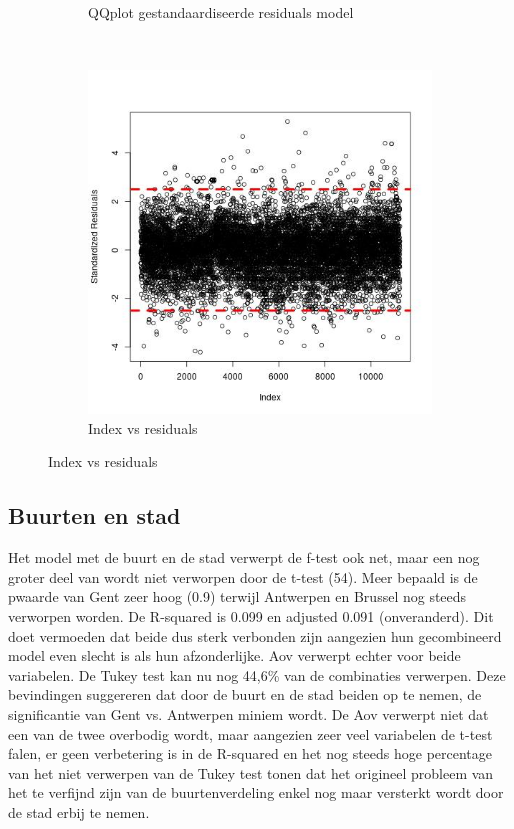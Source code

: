 \documentclass[a4paper,kulak]{kulakarticle} %
\begin{document}
\begin{figure}[H]
\begin{subfigure}[b]{0.3\textwidth}
		\caption{QQplot gestandaardiseerde residuals model}
		\label{fig:qqne}
	\end{subfigure}
	~
	\begin{subfigure}[b]{0.3\textwidth}
		\includegraphics[width=\textwidth]{stdne.jpg}
		\caption{Index vs residuals}
		\label{fig:stdne}
	\end{subfigure}
\end{figure}

\subsection{Buurten en stad}
Het model met de buurt en de stad verwerpt de f-test ook net, maar een nog groter deel van  wordt niet verworpen door de t-test (54). Meer bepaald is de pwaarde van Gent zeer hoog (0.9) terwijl Antwerpen en Brussel nog steeds verworpen worden. 
De R-squared is 0.099 en adjusted 0.091 (onveranderd). Dit doet vermoeden dat beide dus sterk verbonden zijn aangezien hun gecombineerd model even slecht is als hun afzonderlijke.
Aov verwerpt echter voor beide variabelen.
De Tukey test kan nu nog 44,6\% van de combinaties verwerpen.
Deze bevindingen suggereren dat door de buurt en de stad beiden op te nemen, de significantie van Gent vs. Antwerpen miniem wordt. De Aov verwerpt niet dat een van de twee overbodig wordt, maar aangezien zeer veel variabelen de t-test falen, er geen verbetering is in de R-squared en het nog steeds hoge percentage van het niet verwerpen van de Tukey test tonen dat het origineel probleem van het te verfijnd zijn van de buurtenverdeling enkel nog maar versterkt wordt door de stad erbij te nemen.
\end{document}
